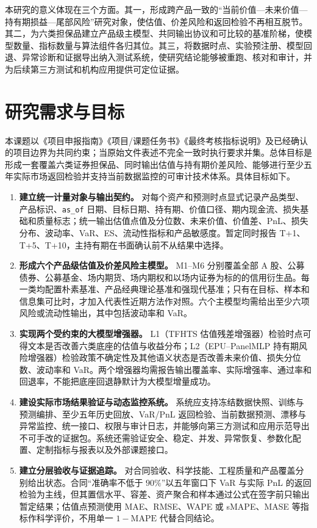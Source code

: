 本研究的意义体现在三个方面。其一，形成跨产品一致的“当前价值—未来价值—持有期损益—尾部风险”研究对象，使估值、价差风险和返回检验不再相互脱节。其二，为六类担保品建立产品级主模型、共同输出协议和可比较的基准阶梯，使模型数量、指标数量与算法组件各归其位。其三，将数据时点、实验预注册、模型回退、异常诊断和证据导出纳入测试系统，使研究结论能够被重跑、核对和审计，并为后续第三方测试和机构应用提供可定位证据。

\section{研究需求与目标}

本课题以《项目申报指南》《项目/课题任务书》《最终考核指标说明》及已经确认的项目边界为共同约束；当原始文件表述不完全一致时执行要求并集。总体目标是形成一套覆盖六类证券担保品、同时输出估值与持有期价差风险、能够进行至少五年实际市场返回检验并支持当前数据监控的可审计技术体系。具体目标如下。

\begin{enumerate}[label=\arabic*)]
  \item \textbf{建立统一计量对象与输出契约。} 对每个资产和预测时点显式记录产品类型、产品标识、\texttt{as\_of} 日期、目标日期、持有期、价值口径、期内现金流、损失基础和质量标志；统一输出估值点值及分位数、未来价值、价值差、PnL、损失分布、波动率、VaR、ES、流动性指标和产品敏感度。暂定同时报告 T+1、T+5、T+10，主持有期在书面确认前不从结果中选择。
  \item \textbf{形成六个产品级估值及价差风险主模型。} M1--M6 分别覆盖全部 A 股、公募债券、公募基金、场内期货、场内期权和以场内证券为标的的信用衍生品。每一类均配置朴素基准、产品经典理论基准和强现代基准；只有在目标、样本和信息集可比时，才加入代表性近期方法作对照。六个主模型均需给出至少六项风险或流动性输出，其中包括波动率和 VaR。
  \item \textbf{实现两个受约束的大模型增强器。} L1（TFHTS 估值残差增强器）检验时点可得文本是否改善六类底座的估值与收益分布；L2（EPU--PanelMLP 持有期风险增强器）检验政策不确定性及其他语义状态是否改善未来价值、损失分位数、波动率和 VaR。两个增强器均需报告输出覆盖率、实际增强率、通过率和回退率，不能把底座回退静默计为大模型增量成功。
  \item \textbf{建设实际市场结果验证与动态监控系统。} 系统应支持冻结数据快照、训练与预测编排、至少五年历史回放、VaR/PnL 返回检验、当前数据预测、漂移与异常监控、统一接口、权限与审计日志，并能够向第三方测试和应用示范导出不可手改的证据包。系统还需验证安全、稳定、并发、异常恢复、参数化配置、定制指标与报表以及外部课题接口。
  \item \textbf{建立分层验收与证据追踪。} 对合同验收、科学技能、工程质量和产品覆盖分别给出状态。合同“准确率不低于 \(90\%\)”以五年窗口下 VaR 与实际 PnL 的返回检验为主线，但其置信水平、容差、资产聚合和样本通过公式在签字前只输出暂定结果；估值点预测使用 MAE、RMSE、WAPE 或 sMAPE、MASE 等指标作科学评价，不用单一 \(1-\mathrm{MAPE}\) 代替合同结论。
\end{enumerate}

